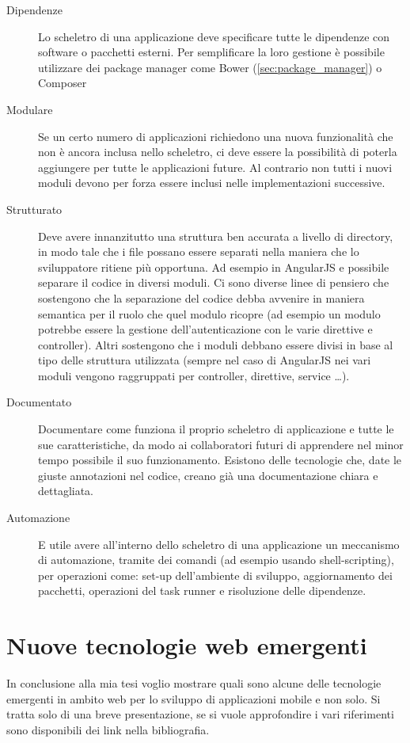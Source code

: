 \begin{description}
\item[Dipendenze] Lo scheletro di una applicazione deve specificare tutte le dipendenze con software o pacchetti esterni. Per semplificare la loro gestione è possibile utilizzare dei package manager come Bower (\ref{sec:package_manager}) o Composer

\item[Modulare] Se un certo numero di applicazioni richiedono una nuova funzionalità che non è ancora inclusa nello scheletro, ci deve essere la possibilità di poterla aggiungere per tutte le applicazioni future. Al contrario non tutti i nuovi moduli devono per forza essere inclusi nelle implementazioni successive.

\item[Strutturato] Deve avere innanzitutto una struttura ben accurata a livello di directory, in modo tale che i file possano essere separati nella maniera che lo sviluppatore ritiene più opportuna. Ad esempio in AngularJS e possibile separare il codice in diversi moduli. Ci sono diverse linee di pensiero che sostengono che la separazione del codice debba avvenire in maniera semantica per il ruolo che quel modulo ricopre (ad esempio un modulo potrebbe essere la gestione dell'autenticazione con le varie direttive e controller). Altri sostengono che i moduli debbano essere divisi in base al tipo delle struttura utilizzata (sempre nel caso di AngularJS nei vari moduli vengono raggruppati per controller, direttive, service \ldots).

\item[Documentato] Documentare come funziona il proprio scheletro di applicazione e tutte le sue caratteristiche, da modo ai collaboratori futuri di apprendere nel minor tempo possibile il suo funzionamento. Esistono delle tecnologie che, date le giuste annotazioni nel codice, creano già una documentazione chiara e dettagliata.

\item[Automazione] E utile avere all'interno dello scheletro di una applicazione un meccanismo di automazione, tramite dei comandi (ad esempio usando shell-scripting), per operazioni come: set-up dell'ambiente di sviluppo, aggiornamento dei pacchetti, operazioni del task runner e risoluzione delle dipendenze.

\end{description} 

\section{Nuove tecnologie web emergenti}
In conclusione alla mia tesi voglio mostrare quali sono alcune delle tecnologie emergenti in ambito web per lo sviluppo di applicazioni mobile e non solo. Si tratta solo di una breve presentazione, se si vuole approfondire i vari riferimenti sono disponibili dei link nella bibliografia.
